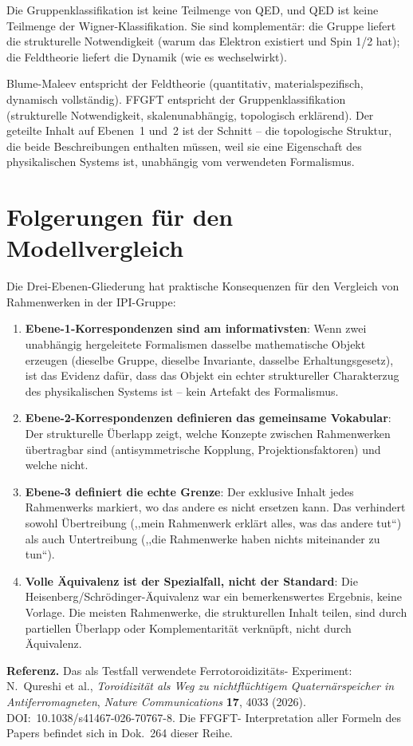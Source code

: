 Die Gruppenklassifikation ist keine Teilmenge von QED, und QED ist keine
Teilmenge der Wigner-Klassifikation. Sie sind komplementär: die Gruppe liefert
die strukturelle Notwendigkeit (warum das Elektron existiert und Spin 1/2 hat);
die Feldtheorie liefert die Dynamik (wie es wechselwirkt).

Blume-Maleev entspricht der Feldtheorie (quantitativ, materialspezifisch,
dynamisch vollständig). FFGFT entspricht der Gruppenklassifikation (strukturelle
Notwendigkeit, skalenunabhängig, topologisch erklärend). Der geteilte Inhalt
auf Ebenen~1 und~2 ist der Schnitt -- die topologische Struktur, die beide
Beschreibungen enthalten müssen, weil sie eine Eigenschaft des physikalischen
Systems ist, unabhängig vom verwendeten Formalismus.

\section{Folgerungen für den Modellvergleich}

Die Drei-Ebenen-Gliederung hat praktische Konsequenzen für den Vergleich von
Rahmenwerken in der IPI-Gruppe:

\begin{enumerate}
  \item \textbf{Ebene-1-Korrespondenzen sind am informativsten}: Wenn zwei
        unabhängig hergeleitete Formalismen dasselbe mathematische Objekt
        erzeugen (dieselbe Gruppe, dieselbe Invariante, dasselbe Erhaltungsgesetz),
        ist das Evidenz dafür, dass das Objekt ein echter struktureller
        Charakterzug des physikalischen Systems ist -- kein Artefakt des
        Formalismus.
  \item \textbf{Ebene-2-Korrespondenzen definieren das gemeinsame Vokabular}:
        Der strukturelle Überlapp zeigt, welche Konzepte zwischen Rahmenwerken
        übertragbar sind (antisymmetrische Kopplung, Projektionsfaktoren) und
        welche nicht.
  \item \textbf{Ebene-3 definiert die echte Grenze}: Der exklusive Inhalt
        jedes Rahmenwerks markiert, wo das andere es nicht ersetzen kann.
        Das verhindert sowohl Übertreibung (,,mein Rahmenwerk erklärt alles,
        was das andere tut``) als auch Untertreibung (,,die Rahmenwerke haben
        nichts miteinander zu tun``).
  \item \textbf{Volle Äquivalenz ist der Spezialfall, nicht der Standard}:
        Die Heisenberg/Schrödinger-Äquivalenz war ein bemerkenswertes Ergebnis,
        keine Vorlage. Die meisten Rahmenwerke, die strukturellen Inhalt teilen,
        sind durch partiellen Überlapp oder Komplementarität verknüpft,
        nicht durch Äquivalenz.
\end{enumerate}

\noindent\textbf{Referenz.} Das als Testfall verwendete Ferrotoroidizitäts-
Experiment: N.~Qureshi et al., \textit{Toroidizität als Weg zu nichtflüchtigem
Quaternärspeicher in Antiferromagneten}, \textit{Nature Communications}
\textbf{17}, 4033 (2026). DOI:~10.1038/s41467-026-70767-8. Die FFGFT-
Interpretation aller Formeln des Papers befindet sich in Dok.~264 dieser Reihe.
